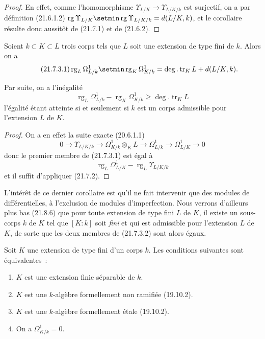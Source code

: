 \begin{proof}
En effet, comme l'homomorphisme
$\Upsilon_{L/K}\to\Upsilon_{L/K/k}$ est surjectif, on a par définition
(21.6.1.2)
$\operatorname{rg}\Upsilon_{L/K}\setmin\operatorname{rg}\Upsilon_{L/K/k}
=d(L/K,k)$, et le corollaire résulte donc aussitôt de (21.7.1) et de
(21.6.2).
\end{proof}

\begin{corollary}[21.7.3]
\label{0.21.7.3-fr}
Soient $k\subset K\subset L$ trois corps tels que $L$ soit une extension de
type fini de $k$. Alors on a
\begin{equation}
\tag{21.7.3.1}
\label{0.21.7.3.1-fr}
\operatorname{rg}_L\Omega^1_{L/k}\setmin\operatorname{rg}_K\Omega^1_{K/k}
=\deg.\operatorname{tr}_K L+d(L/K,k).
\end{equation}

Par suite, on a l'inégalité
\begin{equation}
\tag{21.7.3.2}
\label{0.21.7.3.2-fr}
\operatorname{rg}_L\Omega^1_{L/k}-\operatorname{rg}_K\Omega^1_{K/k}
\geqslant\deg.\operatorname{tr}_K L
\end{equation}
l'égalité étant atteinte si et seulement si $k$ est un corps admissible pour
l'extension $L$ de $K$.
\end{corollary}

\begin{proof}
On a en effet la suite exacte (20.6.1.1)
\[
0\to\Upsilon_{L/K/k}\to\Omega^1_{K/k}\otimes_KL\to\Omega^1_{L/k}
\to\Omega^1_{L/K}\to0
\]
donc le premier membre de (21.7.3.1) est égal à
\[
\operatorname{rg}_L\Omega^1_{L/K}-\operatorname{rg}_L\Upsilon_{L/K/k}
\]
et il suffit d'appliquer (21.7.2).
\end{proof}

L'intérêt de ce dernier corollaire est qu'il ne fait intervenir que des
modules de différentielles, à l'exclusion de modules d'imperfection. Nous
verrons d'ailleurs plus bas (21.8.6) que pour toute extension de type fini
$L$ de $K$, il existe un sous-corps $k$ de $K$ tel que $[K:k]$ soit \emph{fini} et
qui est admissible pour l'extension $L$ de $K$, de sorte que les deux membres
de (21.7.3.2) sont alors égaux.

\begin{corollary}[21.7.4]
\label{0.21.7.4-fr}
Soit $K$ une extension de type fini d'un corps $k$. Les conditions suivantes
sont équivalentes~:
\begin{enumerate}
  \item[\rm a)] $K$ est une extension finie séparable de $k$.
  \item[\rm b)] $K$ est une $k$-algèbre formellement non ramifiée \textup{(19.10.2)}.
  \item[\rm c)] $K$ est une $k$-algèbre formellement étale \textup{(19.10.2)}.
  \item[\rm d)] On a $\Omega^1_{K/k}=0$.
\end{enumerate}
\end{corollary}


